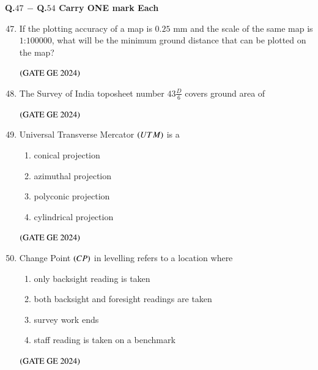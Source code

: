 \documentclass[journal,12pt,onecolumn]{IEEEtran}
\theoremstyle{remark}
\begin{document}
\textbf{Q.$47$ $-$ Q.$54$ Carry ONE mark Each}\\
\begin{enumerate}
\setcounter{enumi}{46}
\item If the plotting accuracy of a map is $0.25$ mm and the scale of the same map is $1$:$100000$, what will be the minimum ground distance that can be plotted on the map?
\begin{enumerate}
\end{enumerate}
\hfill $\brak{\text{GATE GE 2024}}$
\bigskip
\item The Survey of India toposheet number $43\frac{D}{6}$ covers ground area of
\begin{enumerate}
\end{enumerate}
\hfill $\brak{\text{GATE GE 2024}}$
\bigskip
\item Universal Transverse Mercator $\brak{UTM}$ is a
\begin{enumerate}
\item conical projection
\item azimuthal projection
\item polyconic projection
\item cylindrical projection
\end{enumerate}
\hfill $\brak{\text{GATE GE 2024}}$
\bigskip
\item Change Point $\brak{CP}$ in levelling refers to a location where
\begin{enumerate}
\item only backsight reading is taken
\item both backsight and foresight readings are taken
\item survey work ends
\item staff reading is taken on a benchmark
\end{enumerate}
\hfill $\brak{\text{GATE GE 2024}}$

\end{enumerate}
\end{document}
